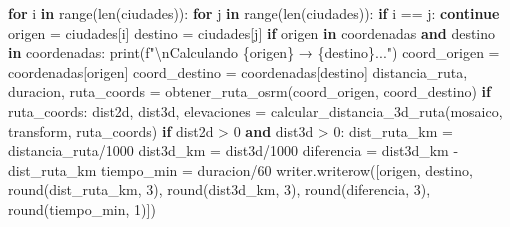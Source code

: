 \documentclass[
  letterpaper,
  DIV=11,
  numbers=noendperiod]{scrreprt}
\newenvironment{Shaded}{\begin{snugshade}}{\end{snugshade}}
\newcommand{\BuiltInTok}[1]{\textcolor[rgb]{0.00,0.23,0.31}{#1}}
\newcommand{\CharTok}[1]{\textcolor[rgb]{0.13,0.47,0.30}{#1}}
\newcommand{\ControlFlowTok}[1]{\textcolor[rgb]{0.00,0.23,0.31}{\textbf{#1}}}
\newcommand{\DecValTok}[1]{\textcolor[rgb]{0.68,0.00,0.00}{#1}}
\newcommand{\KeywordTok}[1]{\textcolor[rgb]{0.00,0.23,0.31}{\textbf{#1}}}
\newcommand{\NormalTok}[1]{\textcolor[rgb]{0.00,0.23,0.31}{#1}}
\newcommand{\OperatorTok}[1]{\textcolor[rgb]{0.37,0.37,0.37}{#1}}
\newcommand{\SpecialCharTok}[1]{\textcolor[rgb]{0.37,0.37,0.37}{#1}}
\newcommand{\SpecialStringTok}[1]{\textcolor[rgb]{0.13,0.47,0.30}{#1}}
\begin{document}
\begin{Shaded}
\begin{Highlighting}[]
    \ControlFlowTok{for}\NormalTok{ i }\KeywordTok{in} \BuiltInTok{range}\NormalTok{(}\BuiltInTok{len}\NormalTok{(ciudades)):}
        \ControlFlowTok{for}\NormalTok{ j }\KeywordTok{in} \BuiltInTok{range}\NormalTok{(}\BuiltInTok{len}\NormalTok{(ciudades)):}
            \ControlFlowTok{if}\NormalTok{ i }\OperatorTok{==}\NormalTok{ j:}
                \ControlFlowTok{continue}
\NormalTok{            origen }\OperatorTok{=}\NormalTok{ ciudades[i]}
\NormalTok{            destino }\OperatorTok{=}\NormalTok{ ciudades[j]}
            \ControlFlowTok{if}\NormalTok{ origen }\KeywordTok{in}\NormalTok{ coordenadas }\KeywordTok{and}\NormalTok{ destino }\KeywordTok{in}\NormalTok{ coordenadas:}
                \BuiltInTok{print}\NormalTok{(}\SpecialStringTok{f"}\CharTok{\textbackslash{}n}\SpecialStringTok{Calculando }\SpecialCharTok{\{}\NormalTok{origen}\SpecialCharTok{\}}\SpecialStringTok{ → }\SpecialCharTok{\{}\NormalTok{destino}\SpecialCharTok{\}}\SpecialStringTok{..."}\NormalTok{)}
\NormalTok{                coord\_origen }\OperatorTok{=}\NormalTok{ coordenadas[origen]}
\NormalTok{                coord\_destino }\OperatorTok{=}\NormalTok{ coordenadas[destino]}
\NormalTok{                distancia\_ruta, duracion, ruta\_coords }\OperatorTok{=} 
\NormalTok{                    obtener\_ruta\_osrm(coord\_origen, coord\_destino)}
                \ControlFlowTok{if}\NormalTok{ ruta\_coords:}
\NormalTok{                    dist2d, dist3d, elevaciones }\OperatorTok{=}
\NormalTok{                        calcular\_distancia\_3d\_ruta(mosaico, transform,}
\NormalTok{                             ruta\_coords)}
                    \ControlFlowTok{if}\NormalTok{ dist2d }\OperatorTok{\textgreater{}} \DecValTok{0} \KeywordTok{and}\NormalTok{ dist3d }\OperatorTok{\textgreater{}} \DecValTok{0}\NormalTok{:}
\NormalTok{                        dist\_ruta\_km }\OperatorTok{=}\NormalTok{ distancia\_ruta}\OperatorTok{/}\DecValTok{1000}
\NormalTok{                        dist3d\_km }\OperatorTok{=}\NormalTok{ dist3d}\OperatorTok{/}\DecValTok{1000}
\NormalTok{                        diferencia }\OperatorTok{=}\NormalTok{ dist3d\_km }\OperatorTok{{-}}\NormalTok{ dist\_ruta\_km}
\NormalTok{                        tiempo\_min }\OperatorTok{=}\NormalTok{ duracion}\OperatorTok{/}\DecValTok{60}
\NormalTok{                        writer.writerow([origen, destino,}
                            \BuiltInTok{round}\NormalTok{(dist\_ruta\_km, }\DecValTok{3}\NormalTok{), }\BuiltInTok{round}\NormalTok{(dist3d\_km, }\DecValTok{3}\NormalTok{),}
                            \BuiltInTok{round}\NormalTok{(diferencia, }\DecValTok{3}\NormalTok{), }\BuiltInTok{round}\NormalTok{(tiempo\_min, }\DecValTok{1}\NormalTok{)])}

\end{Highlighting}
\end{Shaded}
\end{document}
